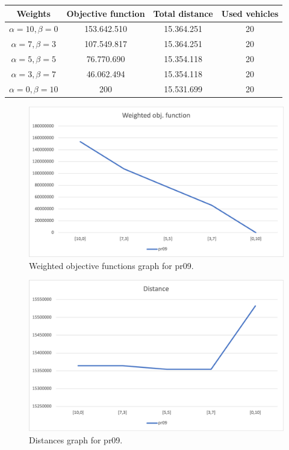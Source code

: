 {
\renewcommand{\arraystretch}{2}
\begin{longtable}[h]{| c | c | c | c |}
    \hline
    \textbf{Weights} & \textbf{Objective function} & \textbf{Total distance} & \textbf{Used vehicles} \\
    \hline
    \endhead
    $\alpha = 10, \beta = 0$ & 153.642.510 & 15.364.251 & 20 \\
    \hline
    $\alpha = 7, \beta = 3$  & 107.549.817 & 15.364.251 & 20 \\
    \hline
    $\alpha = 5, \beta = 5$  &  76.770.690 & 15.354.118 & 20 \\
    \hline
    $\alpha = 3, \beta = 7$  &  46.062.494 & 15.354.118 & 20 \\
    \hline
    $\alpha = 0, \beta = 10$ &         200 & 15.531.699 & 20 \\
    \hline
\end{longtable}
}
\begin{figure}[H]
    \centering
    \includegraphics[width=1.0\columnwidth]{../graphs/pr09-wobjf.png}
    \caption{Weighted objective functions graph for pr09.}
\end{figure}

\begin{figure}[H]
    \centering
    \includegraphics[width=1.0\columnwidth]{../graphs/pr09-distance.png}
    \caption{Distances graph for pr09.}
\end{figure}

